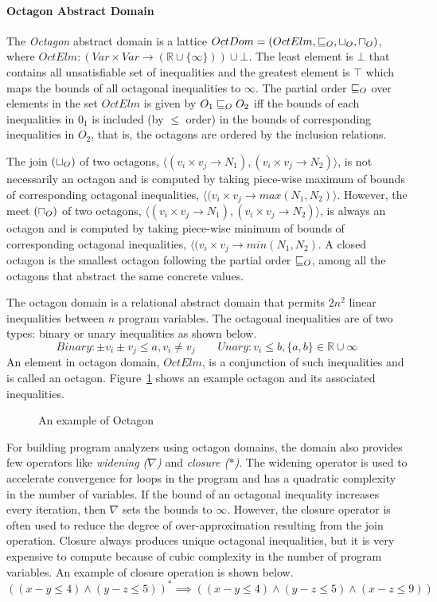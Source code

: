 \paragraph{Octagon Abstract Domain} 
The {\em Octagon} abstract domain is a lattice 
$OctDom = (OctElm, \sqsubseteq_{O}, \sqcup_{O}, \sqcap_{O})$, where
$OctElm: (Var \times Var \rightarrow (\mathbb{R} \cup \{\infty\})) \cup \bot$. 
The least element is $\bot$ that contains all unsatisfiable 
set of inequalities and the greatest element is $\top$ which 
maps the bounds of all octagonal inequalities to $\infty$. 
The partial order $\sqsubseteq_{O}$ over elements in the set $OctElm$ is 
given by $O_1 \sqsubseteq_{O} O_2$ iff the bounds of each inequalities in $0_1$ 
is included (by $\leq$ order) in the bounds of corresponding inequalities 
in $O_2$, that is, the octagons are ordered by the inclusion relations.

The join $(\sqcup_{O})$ of two octagons, $\langle (v_i \times v_j \rightarrow N_1),
(v_i \times v_j \rightarrow N_2) \rangle$, is not necessarily an octagon 
and is computed by taking piece-wise maximum of bounds of corresponding 
octagonal inequalities, $\langle (v_i \times v_j \rightarrow max(N_1, N_2) \rangle$.
However, the meet $(\sqcap_{O})$ of two octagons, $\langle (v_i \times v_j \rightarrow N_1),
(v_i \times v_j \rightarrow N_2) \rangle$, is always an octagon and is 
computed by taking piece-wise minimum of bounds of corresponding 
octagonal inequalities, $\langle (v_i \times v_j \rightarrow min(N_1, N_2)$.  A closed 
octagon is the smallest octagon following the partial order $\sqsubseteq_{O}$, among all 
the octagons that abstract the same concrete values.

The octagon domain is a relational abstract domain that permits $2n^2$ 
linear inequalities between $n$ program variables.  The octagonal 
inequalities are of two types: binary or unary inequalities as shown below.
\[Binary: \pm v_i \pm v_j \leq a, v_i \neq v_j \qquad Unary: v_i \leq b, \{a, b\} \in \mathbb{R} \cup \infty \]  
An element in octagon domain, $OctElm$, is a conjunction of such 
inequalities and is called an octagon.  Figure~\ref{octagon} shows an 
example octagon and its associated inequalities.   
%
\begin{wrapfigure}{r}{5.5cm}
\caption{An example of Octagon}\label{octagon}
\end{wrapfigure} 
%
For building program analyzers using octagon domains, the domain also 
provides few operators like {\em widening ($\nabla$)} and {\em closure ($*$)}.  
The widening operator is used to accelerate convergence for loops in the program
and has a quadratic complexity in the number of variables.  If the bound of an 
octagonal inequality increases every iteration, then $\nabla$ sets the bounds 
to $\infty$.  However, the closure operator is often used to reduce the degree 
of over-approximation resulting from the join operation. Closure always produces 
unique octagonal inequalities, but it is very expensive to compute because of 
cubic complexity in the number of program variables. An example of closure
operation is shown below.
\[((x-y \leq 4) \wedge (y-z \leq 5))^* \implies ((x-y \leq 4) \wedge (y-z \leq 5) \wedge (x-z \leq 9)) \]  
 
